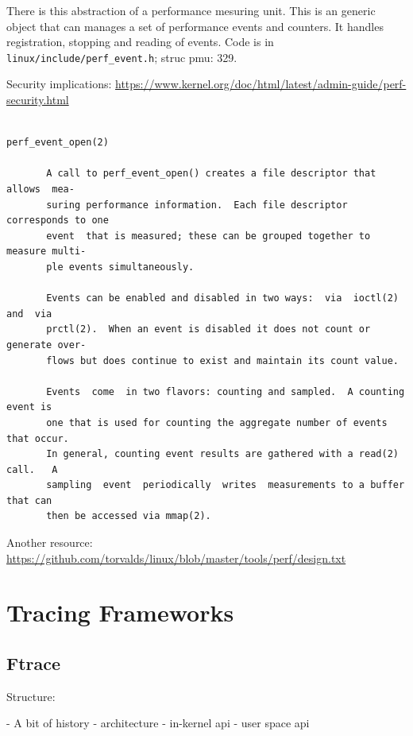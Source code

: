 There is this abstraction of a performance mesuring unit. This is an
generic object that can manages a set of performance events and
counters. It handles registration, stopping and reading of events.
Code is in \verb|linux/include/perf_event.h|; struc pmu: 329.


Security implications:
\url{https://www.kernel.org/doc/html/latest/admin-guide/perf-security.html}

\begin{verbatim}

perf_event_open(2)

       A call to perf_event_open() creates a file descriptor that  allows  mea‐
       suring performance information.  Each file descriptor corresponds to one
       event  that is measured; these can be grouped together to measure multi‐
       ple events simultaneously.

       Events can be enabled and disabled in two ways:  via  ioctl(2)  and  via
       prctl(2).  When an event is disabled it does not count or generate over‐
       flows but does continue to exist and maintain its count value.

       Events  come  in two flavors: counting and sampled.  A counting event is
       one that is used for counting the aggregate number of events that occur.
       In general, counting event results are gathered with a read(2) call.   A
       sampling  event  periodically  writes  measurements to a buffer that can
       then be accessed via mmap(2).

\end{verbatim}

Another resource:
  \url{https://github.com/torvalds/linux/blob/master/tools/perf/design.txt}



  
\section{Tracing Frameworks}

\subsection{Ftrace}

Structure:

- A bit of history
- architecture
- in-kernel api
- user space api

